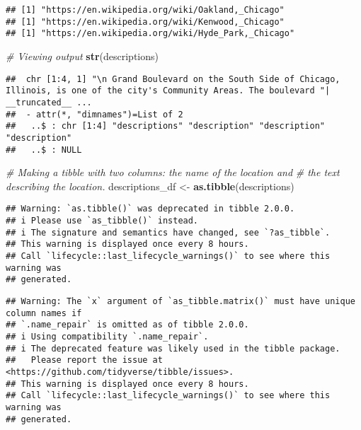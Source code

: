 \documentclass[
]{article}
\newenvironment{Shaded}{\begin{snugshade}}{\end{snugshade}}
\newcommand{\CommentTok}[1]{\textcolor[rgb]{0.56,0.35,0.01}{\textit{#1}}}
\newcommand{\FunctionTok}[1]{\textcolor[rgb]{0.13,0.29,0.53}{\textbf{#1}}}
\newcommand{\NormalTok}[1]{#1}
\newcommand{\OtherTok}[1]{\textcolor[rgb]{0.56,0.35,0.01}{#1}}
\begin{document}
\begin{verbatim}
## [1] "https://en.wikipedia.org/wiki/Oakland,_Chicago"
## [1] "https://en.wikipedia.org/wiki/Kenwood,_Chicago"
## [1] "https://en.wikipedia.org/wiki/Hyde_Park,_Chicago"
\end{verbatim}

\begin{Shaded}
\begin{Highlighting}[]
\CommentTok{\# Viewing output}
\FunctionTok{str}\NormalTok{(descriptions)}
\end{Highlighting}
\end{Shaded}

\begin{verbatim}
##  chr [1:4, 1] "\n Grand Boulevard on the South Side of Chicago, Illinois, is one of the city's Community Areas. The boulevard "| __truncated__ ...
##  - attr(*, "dimnames")=List of 2
##   ..$ : chr [1:4] "descriptions" "description" "description" "description"
##   ..$ : NULL
\end{verbatim}

\begin{Shaded}
\begin{Highlighting}[]
\CommentTok{\# Making a tibble with two columns: the name of the location and }
\CommentTok{\# the text describing the location.}
\NormalTok{descriptions\_df }\OtherTok{\textless{}{-}} \FunctionTok{as.tibble}\NormalTok{(descriptions)}
\end{Highlighting}
\end{Shaded}

\begin{verbatim}
## Warning: `as.tibble()` was deprecated in tibble 2.0.0.
## i Please use `as_tibble()` instead.
## i The signature and semantics have changed, see `?as_tibble`.
## This warning is displayed once every 8 hours.
## Call `lifecycle::last_lifecycle_warnings()` to see where this warning was
## generated.
\end{verbatim}

\begin{verbatim}
## Warning: The `x` argument of `as_tibble.matrix()` must have unique column names if
## `.name_repair` is omitted as of tibble 2.0.0.
## i Using compatibility `.name_repair`.
## i The deprecated feature was likely used in the tibble package.
##   Please report the issue at <https://github.com/tidyverse/tibble/issues>.
## This warning is displayed once every 8 hours.
## Call `lifecycle::last_lifecycle_warnings()` to see where this warning was
## generated.
\end{verbatim}
\end{document}
